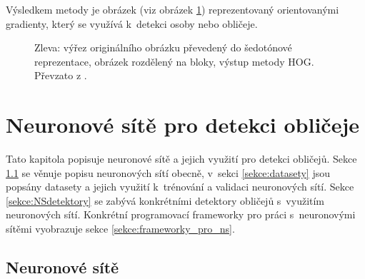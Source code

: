 Výsledkem metody je obrázek (viz obrázek \ref{hogexample}) reprezentovaný orientovanými gradienty, který se využívá k~detekci osoby nebo obličeje.

\begin{figure}[H]
  \begin{center}
  \label{hogexample}
  \caption{Zleva: výřez originálního obrázku převedený do šedotónové reprezentace, obrázek rozdělený na bloky, výstup metody HOG. Převzato z \cite{hog2}.}
  \end{center}
\end{figure}


\chapter{Neuronové sítě pro detekci obličeje}
\label{kapitola:neuronove_site}
Tato kapitola popisuje neuronové sítě a jejich využití pro detekci obličejů. Sekce \ref{sekce:NS} se věnuje popisu neuronových sítí obecně, v~sekci \ref{sekce:datasety} jsou popsány datasety a jejich využití k~trénování a validaci neuronových sítí. Sekce \ref{sekce:NSdetektory} se zabývá konkrétními detektory obličejů s~využitím neuronových sítí. Konkrétní programovací frameworky pro práci s~neuronovými sítěmi vyobrazuje sekce \ref{sekce:frameworky_pro_ns}.

\section{Neuronové sítě}
\label{sekce:NS}


